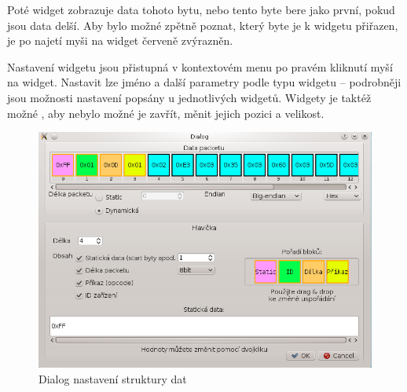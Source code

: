 \documentclass[12pt, a4paper, oneside]{article}
\begin{document}
Poté widget zobrazuje data tohoto bytu, nebo tento byte bere jako první, pokud jsou data delší. Aby bylo možné zpětně poznat, který byte je k widgetu přiřazen, je po najetí myši na widget červeně zvýrazněn.

Nastavení widgetu jsou přistupná v kontextovém menu po pravém kliknutí myší na widget. Nastavit lze jméno a další parametry podle typu widgetu -- podrobněji jsou možnosti nastavení popsány u jednotlivých widgetů. Widgety je taktéž možné , aby nebylo možné je zavřít, měnit jejich pozici a velikost.

\begin{figure}[h]
\begin{center}
\includegraphics[scale=0.7]{img/analyzer_struct.png}
\caption{Dialog nastavení struktury dat}
\label{Analyzer_struct}
\end{center}
\end{figure}
\end{document}
